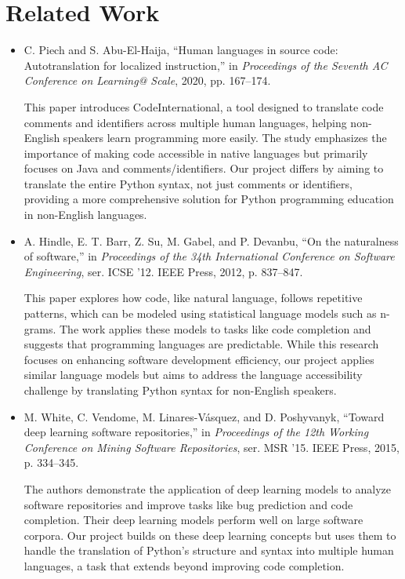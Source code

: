 \documentclass[9pt]{papertex}
\begin{document}
\section{Related Work}
    \begin{itemize}
        \item C. Piech and S. Abu-El-Haija, “Human languages in source code: Autotranslation for localized instruction,” in \textit{Proceedings of the Seventh AC Conference on Learning@ Scale}, 2020, pp. 167–174.

        This paper introduces CodeInternational, a tool designed to translate code comments and identifiers across multiple human languages, helping non-English speakers learn programming more easily. The study emphasizes the importance of making code accessible in native languages but primarily focuses on Java and comments/identifiers. Our project differs by aiming to translate the entire Python syntax, not just comments or identifiers, providing a more comprehensive solution for Python programming education in non-English languages.
        
        \item A. Hindle, E. T. Barr, Z. Su, M. Gabel, and P. Devanbu, “On the naturalness of software,” in \textit{Proceedings of the 34th International Conference on Software Engineering}, ser. ICSE ’12. IEEE Press, 2012, p. 837–847.
        
        This paper explores how code, like natural language, follows repetitive patterns, which can be modeled using statistical language models such as n-grams. The work applies these models to tasks like code completion and suggests that programming languages are predictable. While this research focuses on enhancing software development efficiency, our project applies similar language models but aims to address the language accessibility challenge by translating Python syntax for non-English speakers.
        
        \item M. White, C. Vendome, M. Linares-Vásquez, and D. Poshyvanyk, “Toward deep learning software repositories,” in \textit{Proceedings of the 12th Working Conference on Mining Software Repositories}, ser. MSR ’15. IEEE Press, 2015, p. 334–345.
        
        The authors demonstrate the application of deep learning models to analyze software repositories and improve tasks like bug prediction and code completion. Their deep learning models perform well on large software corpora. Our project builds on these deep learning concepts but uses them to handle the translation of Python's structure and syntax into multiple human languages, a task that extends beyond improving code completion.
        

\end{itemize}
\end{document}
